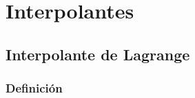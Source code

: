 \documentclass[12pt, fleqn]{report}                             %
\theoremstyle{break}                                            %
\begin{document}
\part{Interpolantes}
\clearpage



    \chapter{Interpolante de Lagrange}

        \clearpage
        \section{Definición}
\end{document}
